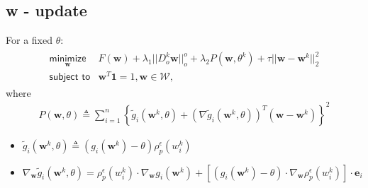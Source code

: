\documentclass{article}
\begin{document}
\subsection{w - update}
For a fixed $\theta$:
\begin{align}\begin{array}{ll}
\underset{\bm{w}}{\textsf{minimize}} & F(\bm{w}) + \lambda_{1}||D^{k}_{o}\bm{w}||^{o}_{o} +
\lambda_{2}P(\bm{w}, \theta^{k}) + \tau ||\bm{w} - \bm{w}^{k}||^{2}_{2}\\
\textsf{subject to} & \bm{w}^{T}\bm{1} = 1, \bm{w} \in \mathcal{W},
\end{array}\end{align}
where
\begin{align}
P(\bm{w}, \theta) \triangleq \sum^{n}_{i=1}\left\{\tilde{g}_{i}(\bm{w}^{k}, \theta) +
                  (\nabla\tilde{g}_{i}(\bm{w}^{k}, \theta))^{T}(\bm{w} - \bm{w}^{k})\right\}^{2}
\end{align}
\begin{itemize}
\item $\tilde{g}_{i}(\bm{w}^{k}, \theta) \triangleq (g_i(\bm{w}^{k}) - \theta) \rho^{\epsilon}_{p}(w^{k}_{i})$
\item $\nabla_{\bm{w}}\tilde{g}_{i}(\bm{w}^{k}, \theta) = \rho^{\epsilon}_{p}(w^{k}_i)\cdot\nabla_{\bm{w}} g_{i}(\bm{w}^{k}) +
       \left[(g_{i}(\bm{w}^k) - \theta)\cdot\nabla_{\bm{w}}\rho^{\epsilon}_{p}(w^k_i)\right]\cdot \bm{e}_i$
\end{itemize}
\end{document}
